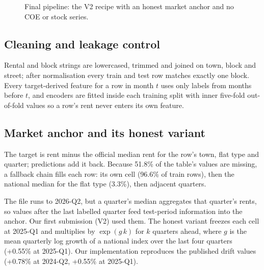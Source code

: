 \documentclass[conference]{IEEEtran}
\newif\ifshowsrc
\newcommand{\src}[1]{\ifshowsrc\textsuperscript{\tiny\color{gray}[#1]}\fi}
\begin{document}
\begin{figure}[t]
{{}}
\caption{Final pipeline: the V2 recipe with an honest market anchor and no COE or stock series.}\label{fig:flow}
\end{figure}

\subsection{Cleaning and leakage control}
Rental and block strings are lowercased, trimmed and joined on town, block and street; after normalisation every train and test row matches exactly one block.\src{Be-join} Every target-derived feature for a row in month $t$ uses only labels from months before $t$,\src{Pu-leak} and encoders are fitted inside each training split with inner five-fold out-of-fold values so a row's rent never enters its own feature.\src{Be-te-leak}

\subsection{Market anchor and its honest variant}
The target is rent minus the official median rent for the row's town, flat type and quarter; predictions add it back. Because 51.8\% of the table's values are missing, a fallback chain fills each row: its own cell (96.6\% of train rows), then the national median for the flat type (3.3\%), then adjacent quarters.\src{Be-anchor}

The file runs to 2026-Q2, but a quarter's median aggregates that quarter's rents, so values after the last labelled quarter feed test-period information into the anchor.\src{Be-leak} Our first submission (V2) used them.\src{Aa-v2anchor} The honest variant freezes each cell at 2025-Q1 and multiplies by $\exp(g\,k)$ for $k$ quarters ahead, where $g$ is the mean quarterly log growth of a national index over the last four quarters (+0.55\% at 2025-Q1).\src{Be-drift} Our implementation reproduces the published drift values (+0.78\% at 2024-Q2, +0.55\% at 2025-Q1).\src{Aa-drift}
\end{document}

